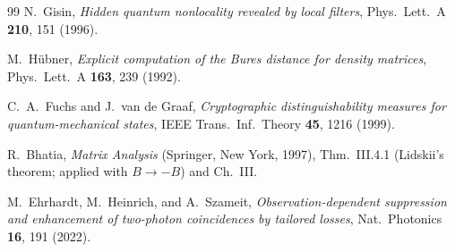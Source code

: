 \documentclass[11pt]{article}
\theoremstyle{remark}
\begin{document}
\begin{thebibliography}{99}
N.~Gisin,
\emph{Hidden quantum nonlocality revealed by local filters},
Phys.\ Lett.\ A \textbf{210}, 151 (1996).

M.~H\"ubner,
\emph{Explicit computation of the Bures distance for density
matrices},
Phys.\ Lett.\ A \textbf{163}, 239 (1992).

C.~A.~Fuchs and J.~van de Graaf,
\emph{Cryptographic distinguishability measures for
quantum-mechanical states},
IEEE Trans.\ Inf.\ Theory \textbf{45}, 1216 (1999).

R.~Bhatia,
\emph{Matrix Analysis}
(Springer, New York, 1997), Thm.~III.4.1 (Lidskii's theorem;
applied with $B\to-B$) and Ch.~III.

M.~Ehrhardt, M.~Heinrich, and A.~Szameit,
\emph{Observation-dependent suppression and enhancement of
two-photon coincidences by tailored losses},
Nat.\ Photonics \textbf{16}, 191 (2022).

\end{thebibliography}
\end{document}
